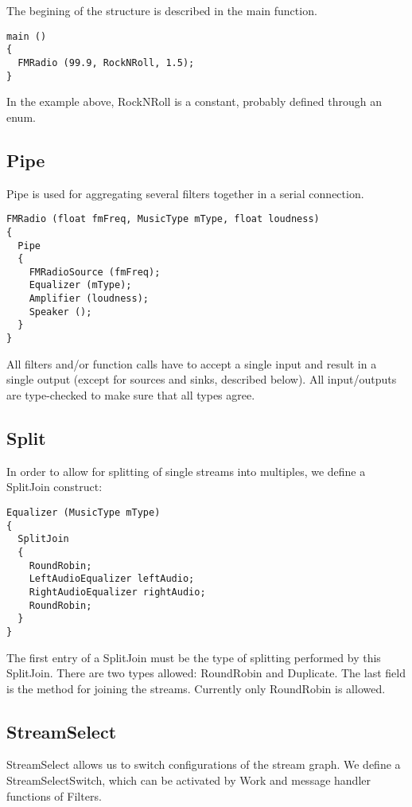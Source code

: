 \documentclass[twocolumn, draft]{article}
\begin{document}
The begining of the structure is described in the main function.

\begin{verbatim}
main ()
{
  FMRadio (99.9, RockNRoll, 1.5);
}
\end{verbatim}

In the example above, RockNRoll is a constant, probably defined through
an enum.

\subsection{Pipe}

Pipe is used for aggregating several filters together in a serial connection.

\begin{verbatim}
FMRadio (float fmFreq, MusicType mType, float loudness)
{
  Pipe
  {
    FMRadioSource (fmFreq);
    Equalizer (mType);
    Amplifier (loudness);
    Speaker ();
  }
}
\end{verbatim}

All filters and/or function calls have to accept a single input and result
in a single output (except for sources and sinks, described below).
All input/outputs are type-checked to make sure that
all types agree.

\subsection{Split}

In order to allow for splitting of single streams into multiples,
we define a SplitJoin construct:

\begin{verbatim}
Equalizer (MusicType mType)
{
  SplitJoin
  {
    RoundRobin;
    LeftAudioEqualizer leftAudio;
    RightAudioEqualizer rightAudio;
    RoundRobin;
  }
}
\end{verbatim}

The first entry of a SplitJoin must be the type of splitting performed
by this SplitJoin.  There are two types allowed:  RoundRobin and Duplicate.
The last field is the method for joining the streams.  Currently only
RoundRobin is allowed.

\subsection{StreamSelect}

StreamSelect allows us to switch configurations of the stream graph.
We define a StreamSelectSwitch, which can be activated by Work and message
handler functions of Filters. 
\end{document}
